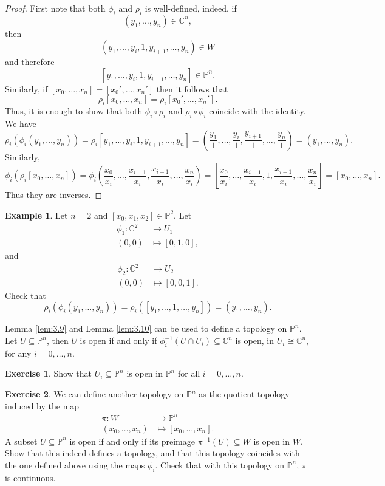 \documentclass{article}
\newcommand{\C}{\mathbb{C}}
\renewcommand{\P}{\mathbb{P}}
\newcommand{\rb}[1]{\left( #1 \right)}
\renewcommand{\sb}[1]{\left[ #1 \right]}
\theoremstyle{definition}\newtheorem{definition}{Definition}[section]
\theoremstyle{definition}\newtheorem{notation}[definition]{Notation}
\theoremstyle{definition}\newtheorem{remark}[definition]{Remark}
\theoremstyle{definition}\newtheorem{example1}[definition]{Example}
\theoremstyle{definition}\newtheorem{fact}{Fact}
\theoremstyle{definition}\newtheorem{exercise}{Exercise}
\theoremstyle{definition}\newtheorem*{example2}{Example}
\begin{document}
\begin{proof}
First note that both $ \phi_i $ and $ \rho_i $ is well-defined, indeed, if
$$ \rb{y_1, \dots, y_n} \in \C^n, $$
then
$$ \rb{y_1, \dots, y_i, 1, y_{i + 1}, \dots, y_n} \in W $$
and therefore
$$ \sb{y_1, \dots, y_i, 1, y_{i + 1}, \dots, y_n} \in \P^n. $$
Similarly, if $ \sb{x_0, \dots, x_n} = \sb{x_0', \dots, x_n'} $ then it follows that
$$ \rho_i\sb{x_0, \dots, x_n} = \rho_i\sb{x_0', \dots, x_n'}. $$
Thus, it is enough to show that both $ \phi_i \circ \rho_i $ and $ \rho_i \circ \phi_i $ coincide with the identity. We have
$$ \rho_i\rb{\phi_i\rb{y_1, \dots, y_n}} = \rho_i\sb{y_1, \dots, y_i, 1, y_{i + 1}, \dots, y_n} = \rb{\dfrac{y_1}{1}, \dots, \dfrac{y_i}{1}, \dfrac{y_{i + 1}}{1}, \dots, \dfrac{y_n}{1}} = \rb{y_1, \dots, y_n}. $$
Similarly,
$$ \phi_i\rb{\rho_i\sb{x_0, \dots, x_n}} = \phi_i\rb{\dfrac{x_0}{x_i}, \dots, \dfrac{x_{i - 1}}{x_i}, \dfrac{x_{i + 1}}{x_i}, \dots, \dfrac{x_n}{x_i}} = \sb{\dfrac{x_0}{x_i}, \dots, \dfrac{x_{i - 1}}{x_i}, 1, \dfrac{x_{i + 1}}{x_i}, \dots, \dfrac{x_n}{x_i}} = \sb{x_0, \dots, x_n}. $$
Thus they are inverses.
\end{proof}

\begin{example2}
Let $ n = 2 $ and $ \sb{x_0, x_1, x_2} \in \P^2 $. Let
\begin{align*}
\phi_1 : \C^2 & \to U_1 \\
\rb{0, 0} & \mapsto \sb{0, 1, 0},
\end{align*}
and
\begin{align*}
\phi_2 : \C^2 & \to U_2 \\
\rb{0, 0} & \mapsto \sb{0, 0, 1}.
\end{align*}
Check that
$$ \rho_i\rb{\phi_i\rb{y_1, \dots, y_n}} = \rho_i\rb{\sb{y_1, \dots, 1, \dots, y_n}} = \rb{y_1, \dots, y_n}. $$
\end{example2}

Lemma \ref{lem:3.9} and Lemma \ref{lem:3.10} can be used to define a topology on $ \P^n $. Let $ U \subseteq \P^n $, then $ U $ is open if and only if $ \phi_i^{-1}\rb{U \cap U_i} \subseteq \C^n $ is open, in $ U_i \cong \C^n $, for any $ i = 0, \dots, n $.

\begin{exercise}
Show that $ U_i \subseteq \P^n $ is open in $ \P^n $ for all $ i = 0, \dots, n $.
\end{exercise}

\begin{exercise}
\label{ex:11}
We can define another topology on $ \P^n $ as the quotient topology induced by the map
\begin{align*}
\pi : W & \to \P^n \\
\rb{x_0, \dots, x_n} & \mapsto \sb{x_0, \dots, x_n}.
\end{align*}
A subset $ U \subseteq \P^n $ is open if and only if its preimage $ \pi^{-1}\rb{U} \subseteq W $ is open in $ W $. Show that this indeed defines a topology, and that this topology coincides with the one defined above using the maps $ \phi_i $. Check that with this topology on $ \P^n $, $ \pi $ is continuous.
\end{exercise}
\end{document}

